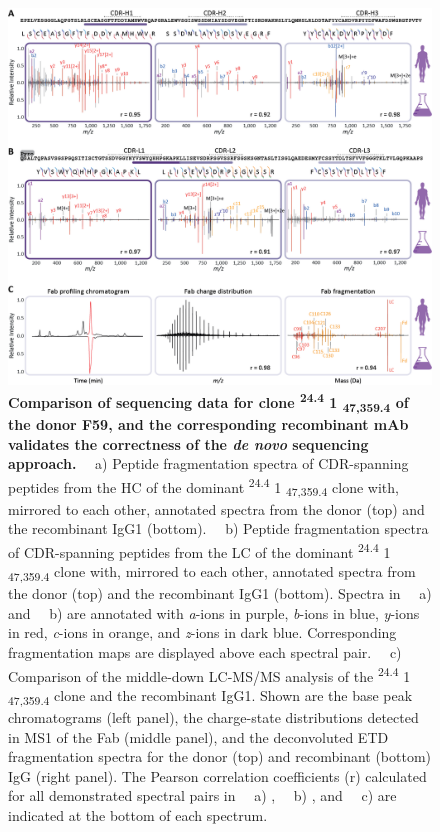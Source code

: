 \begin{figure}[!hptb]
  \center
  \includegraphics[]{Chapter.3/Figures/f5.png}
  \caption{
    \textbf{Comparison of sequencing data for clone \textsuperscript{24.4} 1 \textsubscript{47,359.4} of the donor F59, and the corresponding recombinant mAb validates the correctness of the \emph{de novo} sequencing approach.} ~~a) Peptide fragmentation spectra of CDR-spanning peptides from the HC of the dominant \textsuperscript{24.4} 1 \textsubscript{47,359.4} clone with, mirrored to each other, annotated spectra from the donor (top) and the recombinant IgG1 (bottom). ~~b) Peptide fragmentation spectra of CDR-spanning peptides from the LC of the dominant \textsuperscript{24.4} 1 \textsubscript{47,359.4} clone with, mirrored to each other, annotated spectra from the donor (top) and the recombinant IgG1 (bottom). Spectra in ~~a) and ~~b) are annotated with \emph{a}-ions in purple, \emph{b}-ions in blue, \emph{y}-ions in red, \emph{c}-ions in orange, and \emph{z}-ions in dark blue. Corresponding fragmentation maps are displayed above each spectral pair. ~~c) Comparison of the middle-down LC-MS/MS analysis of the \textsuperscript{24.4} 1 \textsubscript{47,359.4} clone and the recombinant IgG1. Shown are the base peak chromatograms (left panel), the charge-state distributions detected in MS1 of the Fab (middle panel), and the deconvoluted ETD fragmentation spectra for the donor (top) and recombinant (bottom) IgG (right panel). The Pearson correlation coefficients (r) calculated for all demonstrated spectral pairs in ~~a) , ~~b) , and ~~c) are indicated at the bottom of each spectrum.
  }
  \label{fig:fig3.5}
\end{figure}


